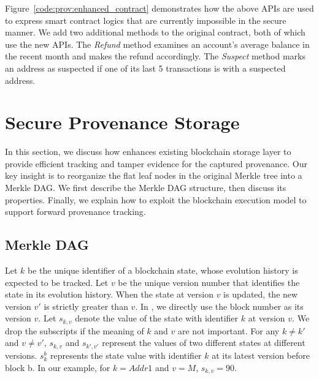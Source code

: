 Figure~\ref{code:prov:enhanced_contract} demonstrates how the above APIs are used to express smart contract logics
that are currently impossible in the secure manner.
We add two additional methods to the original contract, both of which use the new
APIs. The \textit{Refund} method examines an account's average balance in the recent month and makes the
refund accordingly. The \textit{Suspect} method marks an address as suspected if one of its last 5
transactions is with a suspected address. 



\section{Secure Provenance Storage} 
\label{sec:provenance:storage}
In this section, we discuss how {\fs} enhances existing blockchain storage layer to provide efficient
tracking and tamper evidence for the captured provenance. Our key insight is to reorganize the flat leaf
nodes in the original Merkle tree into a Merkle DAG. We first describe the Merkle DAG structure, then discuss
its properties. Finally, we explain how to exploit the blockchain execution model to support forward
provenance tracking. 

\subsection{Merkle DAG}

Let $k$ be the unique identifier of a blockchain state, whose evolution history is expected to be tracked. 
Let $v$ be the unique version number that identifies the state in its evolution history. 
When the state at version $v$ is updated, the new version $v'$ is strictly greater than $v$. 
In {\fs}, we directly use the block number as its version $v$. 
Let $s_{k,v}$ denote the value of the state with identifier
$k$ at version $v$. We drop the subscripts if the meaning of $k$ and $v$ are not important. For any $k \neq
k'$ and $v \neq v'$, $s_{k,v}$ and $s_{k',v'}$ represent the values of two different states at different versions.  
$s^b_k$ represents the state value with identifier $k$ at its latest version before block b. 
In our example, for $k=Addr1$ and $v=M$, $s_{k,v}=90$.

